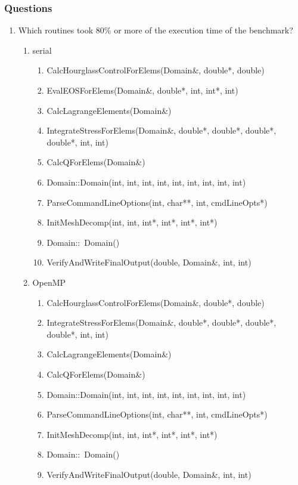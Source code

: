 \documentclass{article}
\begin{document}
\subsubsection{Questions}
\begin{enumerate}
\item{Which routines took 80\% or more of the execution time of the benchmark?
}
\begin{enumerate}
	\item{serial}
	\begin{enumerate}
		\item{CalcHourglassControlForElems(Domain\&, double*, double)}
		\item{EvalEOSForElems(Domain\&, double*, int, int*, int)}
		\item{CalcLagrangeElements(Domain\&)}
		\item{IntegrateStressForElems(Domain\&, double*, double*, double*, double*, int, int)}
		\item{CalcQForElems(Domain\&)}
		\item{Domain::Domain(int, int, int, int, int, int, int, int, int) }
		\item{ParseCommandLineOptions(int, char**, int, cmdLineOpts*) }
		\item{InitMeshDecomp(int, int, int*, int*, int*, int*)}
		\item{Domain::~Domain()}
		\item{VerifyAndWriteFinalOutput(double, Domain\&, int, int) }
	\end{enumerate}
	\item{OpenMP}
	\begin{enumerate}
		\item{CalcHourglassControlForElems(Domain\&, double*, double)}
		\item{IntegrateStressForElems(Domain\&, double*, double*, double*, double*, int, int)}
		\item{CalcLagrangeElements(Domain\&)}
		\item{CalcQForElems(Domain\&)}
		\item{Domain::Domain(int, int, int, int, int, int, int, int, int)}
		\item{ParseCommandLineOptions(int, char**, int, cmdLineOpts*)}
		\item{InitMeshDecomp(int, int, int*, int*, int*, int*)}
		\item{Domain::~Domain()}
		\item{VerifyAndWriteFinalOutput(double, Domain\&, int, int)}		
	\end{enumerate}

\end{enumerate}
\end{enumerate}
\end{document}
